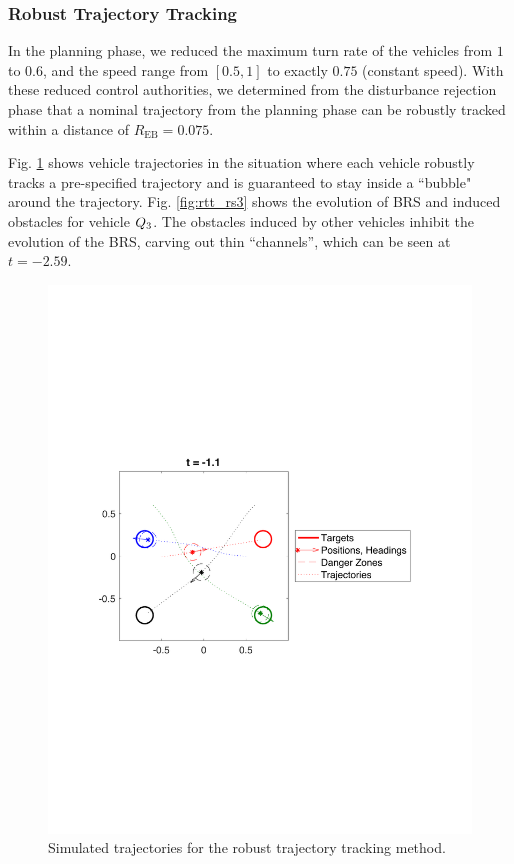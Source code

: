 \subsubsection{Robust Trajectory Tracking}
In the planning phase, we reduced the maximum turn rate of the vehicles from $1$ to $0.6$, and the speed range from $[0.5, 1]$ to exactly $0.75$ (constant speed). With these reduced control authorities, we determined from the disturbance rejection phase that a nominal trajectory from the planning phase can be robustly tracked within a distance of $R_{\text{EB}} = 0.075$.

Fig. \ref{fig:rtt_traj} shows vehicle trajectories in the situation where each vehicle robustly tracks a pre-specified trajectory and is guaranteed to stay inside a ``bubble" around the trajectory. Fig. \ref{fig:rtt_rs3} shows the evolution of BRS and induced obstacles for vehicle $Q_3$. The obstacles induced by other vehicles inhibit the evolution of the BRS, carving out thin ``channels'', which can be seen at $t = -2.59$.%

\begin{figure}
  \centering
  \includegraphics[width=0.8\columnwidth]{fig/rtt_traj}
  \caption{Simulated trajectories for the robust trajectory tracking method.}
  \label{fig:rtt_traj}
\end{figure}

